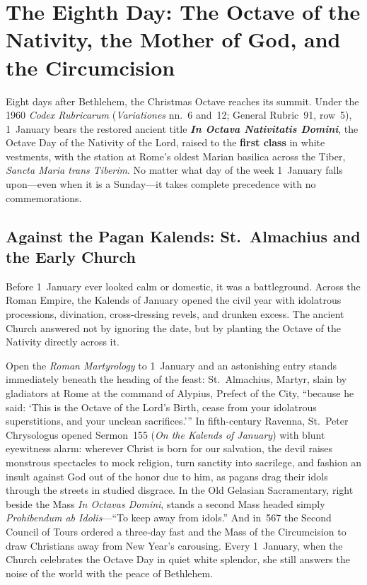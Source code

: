 \section{The Eighth Day: The Octave of the Nativity, the Mother of God, and the Circumcision}\label{sec:jan-1}

Eight days after Bethlehem, the Christmas Octave reaches its summit. Under the
1960 \textit{Codex Rubricarum} (\textit{Variationes} nn.~6 and~12; General
Rubric~91, row~5), 1~January bears the restored ancient title \textbf{\textit{In
Octava Nativitatis Domini}}, the Octave Day of the Nativity of the Lord, raised
to the \textbf{first class} in white vestments, with the station at Rome's
oldest Marian basilica across the Tiber, \textit{Sancta Maria trans Tiberim}.
No matter what day of the week 1~January falls upon---even when it is a
Sunday---it takes complete precedence with no commemorations.

\subsection{Against the Pagan Kalends: St.~Almachius and the Early Church}

Before 1~January ever looked calm or domestic, it was a battleground. Across
the Roman Empire, the Kalends of January opened the civil year with idolatrous
processions, divination, cross-dressing revels, and drunken excess. The ancient
Church answered not by ignoring the date, but by planting the Octave of the
Nativity directly across it.

Open the \textit{Roman Martyrology} to 1~January and an astonishing entry
stands immediately beneath the heading of the feast: St.~Almachius, Martyr,
slain by gladiators at Rome at the command of Alypius, Prefect of the City,
``because he said: `This is the Octave of the Lord's Birth, cease from your
idolatrous superstitions, and your unclean sacrifices.''' In fifth-century
Ravenna, St.~Peter Chrysologus opened Sermon~155 (\textit{On the Kalends of
January}) with blunt eyewitness alarm: wherever Christ is born for our
salvation, the devil raises monstrous spectacles to mock religion, turn sanctity
into sacrilege, and fashion an insult against God out of the honor due to him,
as pagans drag their idols through the streets in studied disgrace. In the Old
Gelasian Sacramentary, right beside the Mass \textit{In Octavas Domini}, stands
a second Mass headed simply \textit{Prohibendum ab Idolis}---``To keep away from
idols.'' And in~567 the Second Council of Tours ordered a three-day fast and the
Mass of the Circumcision to draw Christians away from New Year's carousing.
Every 1~January, when the Church celebrates the Octave Day in quiet white
splendor, she still answers the noise of the world with the peace of Bethlehem.

